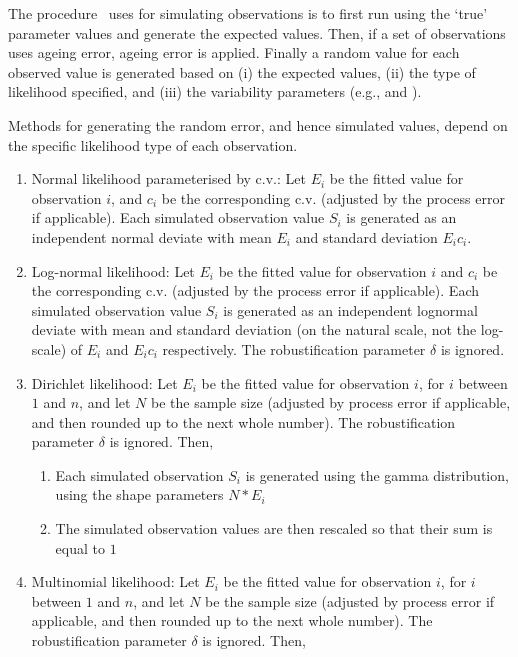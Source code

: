 {{{{{{The procedure \SPM\ uses for simulating observations is to first run using the `true' parameter values and generate the expected values. Then, if a set of observations uses ageing error, ageing error is applied. Finally a random value for each observed value is generated based on (i) the expected values, (ii) the type of likelihood specified, and (iii) the variability parameters (e.g.,  and ). 

Methods for generating the random error, and hence simulated values, depend on the specific likelihood type of each observation. 

\begin{enumerate}
  \item{} Normal likelihood parameterised by c.v.: Let $E_{i}$ be the fitted value for observation $i$, and $c_i$ be the corresponding c.v. (adjusted by the process error if applicable). Each simulated observation value $S_i$ is generated as an independent normal deviate with mean $E_i$ and standard deviation $E_i c_i$.
  \item{} Log-normal likelihood: Let $E_i$ be the fitted value for observation $i$ and $c_i$ be the corresponding c.v. (adjusted by the process error if applicable). Each simulated observation value $S_i$ is generated as an independent lognormal deviate with mean and standard deviation (on the natural scale, not the log-scale) of $E_i$ and $E_i c_i$ respectively. The robustification parameter $\delta$ is ignored.
  \item{} Dirichlet likelihood: Let $E_i$ be the fitted value for observation $i$, for $i$ between $1$ and $n$, and let $N$ be the sample size (adjusted by process error if applicable, and then rounded up to the next whole number). The robustification parameter $\delta$ is ignored. Then, 
  \begin{enumerate}
    \item{} Each simulated observation $S_i$ is generated using the gamma distribution, using the shape parameters $N*E_i$
    \item{} The simulated observation values are then rescaled so that their sum is equal to $1$
  \end{enumerate}
  \item{} Multinomial likelihood: Let $E_i$ be the fitted value for observation $i$, for $i$ between $1$ and $n$, and let $N$ be the sample size (adjusted by process error if applicable, and then rounded up to the next whole number). The robustification parameter $\delta$ is ignored. Then, 

\end{enumerate}}}}}}}
